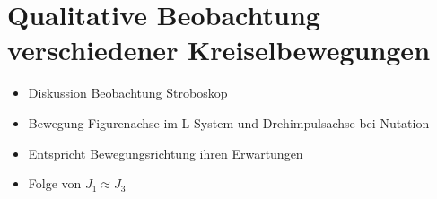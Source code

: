 

\section{Qualitative Beobachtung verschiedener Kreiselbewegungen}

\begin{itemize}
    \item Diskussion Beobachtung Stroboskop
    \item Bewegung Figurenachse im L-System und Drehimpulsachse bei Nutation
    \item Entspricht Bewegungsrichtung ihren Erwartungen
    \item Folge von $J_1 \approx J_3$
\end{itemize}